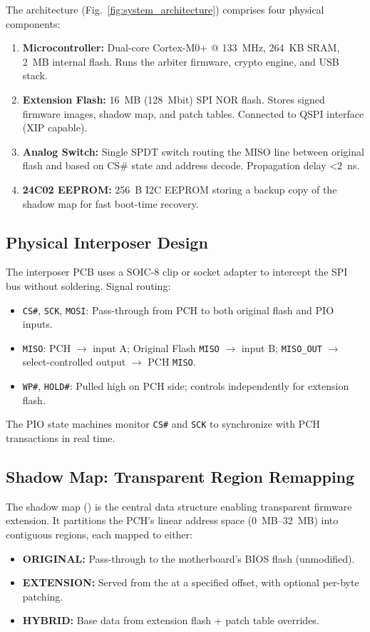 The \vbfc architecture (Fig.~\ref{fig:system_architecture}) comprises four physical components:
\begin{enumerate}
    \item \textbf{\rp Microcontroller:} Dual-core Cortex-M0+ @ \SI{133}{MHz}, \SI{264}{KB} \ac{SRAM}, \SI{2}{MB} internal flash. Runs the arbiter firmware, crypto engine, and USB stack.
    \item \textbf{\wq Extension Flash:} \SI{16}{MB} (\SI{128}{Mbit}) SPI NOR flash. Stores signed firmware images, shadow map, and patch tables. Connected to \rp \ac{QSPI} interface (XIP capable).
    \item \textbf{\mx Analog Switch:} Single SPDT switch routing the \ac{MISO} line between original flash and \rp based on \ac{CS}\# state and address decode. Propagation delay \SI{<2}{ns}.
    \item \textbf{24C02 EEPROM:} \SI{256}{B} I2C \ac{EEPROM} storing a backup copy of the shadow map for fast boot-time recovery.
\end{enumerate}

\subsection{Physical Interposer Design}
The interposer \ac{PCB} uses a SOIC-8 clip or socket adapter to intercept the \ac{SPI} bus without soldering. Signal routing:
\begin{itemize}
    \item \texttt{CS\#}, \texttt{SCK}, \texttt{MOSI}: Pass-through from \ac{PCH} to both original flash and \rp \ac{PIO} inputs.
    \item \texttt{MISO}: \ac{PCH} $\to$ \mx input A; Original Flash \texttt{MISO} $\to$ \mx input B; \rp \texttt{MISO\_OUT} $\to$ \mx select-controlled output $\to$ \ac{PCH} \texttt{MISO}.
    \item \texttt{WP\#}, \texttt{HOLD\#}: Pulled high on \ac{PCH} side; \rp controls independently for extension flash.
\end{itemize}
The \rp \ac{PIO} state machines monitor \texttt{CS\#} and \texttt{SCK} to synchronize with \ac{PCH} transactions in real time.

\subsection{Shadow Map: Transparent Region Remapping}
The shadow map () is the central data structure enabling transparent firmware extension. It partitions the \ac{PCH}'s linear address space (\SI{0}{MB}--\SI{32}{MB}) into contiguous regions, each mapped to either:
\begin{itemize}
    \item \textbf{ORIGINAL:} Pass-through to the motherboard's BIOS flash (unmodified).
    \item \textbf{EXTENSION:} Served from the \wq at a specified offset, with optional per-byte patching.
    \item \textbf{HYBRID:} Base data from extension flash + patch table overrides.
\end{itemize}


